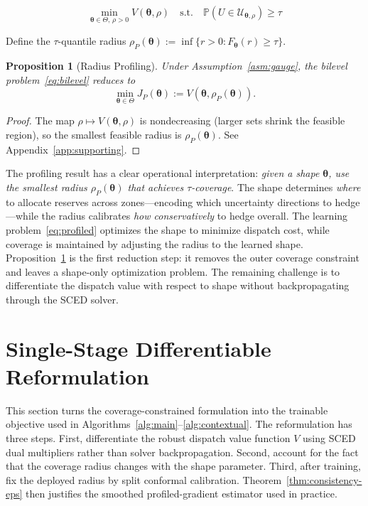 \documentclass[11pt]{article}
\newcommand{\Prob}{\mathbb{P}}
\newcommand{\cU}{\mathcal{U}}
\newcommand{\btheta}{\bm{\theta}}
\newtheorem{proposition}[theorem]{Proposition}
\theoremstyle{definition}
\begin{document}
\begin{equation}\label{eq:bilevel}
\boxed{
\min_{\btheta \in \Theta,\, \rho > 0} V(\btheta,\rho) \quad \text{s.t.} \quad \Prob(U \in \cU_{\btheta,\rho}) \geq \tau
}
\end{equation}

Define the $\tau$-quantile radius $\rho_P(\btheta) := \inf\{r > 0 : F_{\btheta}(r) \geq \tau\}$.

\begin{proposition}[Radius Profiling]\label{prop:profiling}
Under Assumption~\ref{asm:gauge}, the bilevel problem~\eqref{eq:bilevel} reduces to
\begin{equation}\label{eq:profiled}
\min_{\btheta \in \Theta} J_P(\btheta) := V(\btheta, \rho_P(\btheta)).
\end{equation}
\end{proposition}

\begin{proof}
The map $\rho \mapsto V(\btheta, \rho)$ is nondecreasing (larger sets shrink the feasible region), so the smallest feasible radius is $\rho_P(\btheta)$. See Appendix~\ref{app:supporting}.
\end{proof}

The profiling result has a clear operational interpretation: \emph{given a shape $\btheta$, use the smallest radius $\rho_P(\btheta)$ that achieves $\tau$-coverage}. The shape determines \emph{where} to allocate reserves across zones---encoding which uncertainty directions to hedge---while the radius calibrates \emph{how conservatively} to hedge overall. The learning problem~\eqref{eq:profiled} optimizes the shape to minimize dispatch cost, while coverage is maintained by adjusting the radius to the learned shape. Proposition~\ref{prop:profiling} is the first reduction step: it removes the outer coverage constraint and leaves a shape-only optimization problem. The remaining challenge is to differentiate the dispatch value with respect to shape without backpropagating through the SCED solver.

\section{Single-Stage Differentiable Reformulation}
\label{sec:methodology}

This section turns the coverage-constrained formulation into the trainable objective used in Algorithms~\ref{alg:main}--\ref{alg:contextual}. The reformulation has three steps. First, differentiate the robust dispatch value function $V$ using SCED dual multipliers rather than solver backpropagation. Second, account for the fact that the coverage radius changes with the shape parameter. Third, after training, fix the deployed radius by split conformal calibration. Theorem~\ref{thm:consistency-eps} then justifies the smoothed profiled-gradient estimator used in practice.
\end{document}
